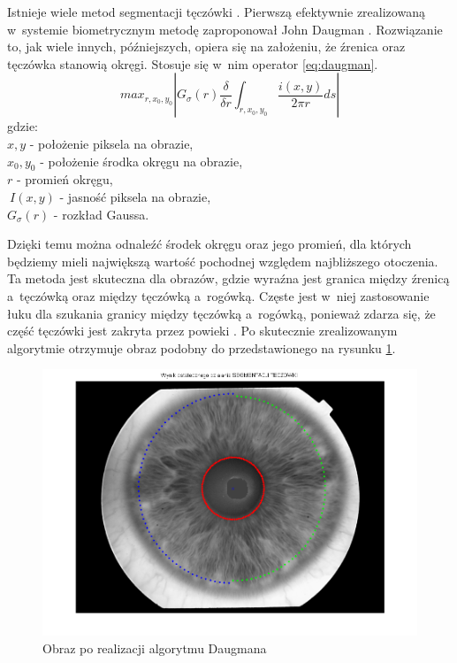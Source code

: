 Istnieje wiele metod segmentacji tęczówki \cite{PrAl06}. Pierwszą efektywnie zrealizowaną w~systemie biometrycznym metodę zaproponował John Daugman \cite{Daugman}. Rozwiązanie to, jak wiele innych, późniejszych, opiera się na założeniu, że źrenica oraz tęczówka stanowią okręgi. Stosuje się w~nim operator \ref{eq:daugman}.
\begin{equation}
\label{eq:daugman}
max_{r,x_{0},y_{0}}\left| G_{\sigma}(r) \frac{\delta}{\delta r}\int_{r,x_{0},y_{0}} \frac{i(x,y)}{2\pi r}ds \right|
\end{equation}
gdzie:\\
$ x,y $ - położenie piksela na obrazie, \\
$ x_{0}, y_{0} $ - położenie środka okręgu na obrazie, \\
$ r $ - promień okręgu, \\
$ ~I(x,y) $ - jasność piksela na obrazie,\\
$ G_{\sigma}(r) $ - rozkład Gaussa.

Dzięki temu można odnaleźć środek okręgu oraz jego promień, dla których będziemy mieli największą wartość pochodnej względem najbliższego otoczenia. Ta metoda jest skuteczna dla obrazów, gdzie wyraźna jest granica między źrenicą a~tęczówką oraz między tęczówką a~rogówką. Częste jest w~niej zastosowanie łuku dla szukania granicy między tęczówką a~rogówką, ponieważ zdarza się, że część tęczówki jest zakryta przez powieki \cite{Kr11}. Po skutecznie zrealizowanym algorytmie otrzymuje obraz podobny do przedstawionego na rysunku \ref{fig:przykladDaugman}.
\begin{figure}
\begin{center}
\includegraphics[scale=0.5]{calosc.png}
\caption{Obraz po realizacji algorytmu Daugmana}
\label{fig:przykladDaugman}
\end{center}
\end{figure}

